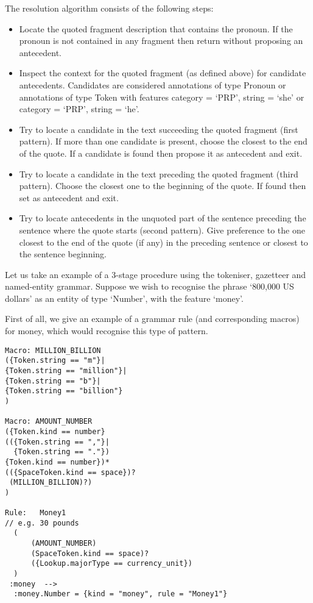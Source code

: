 The resolution algorithm consists of the following steps:
  \begin{itemize}
  \item
  Locate the quoted fragment description that contains the pronoun. If
  the pronoun is not contained in any fragment then return without
  proposing an antecedent.

  \item
  Inspect the context for the quoted fragment (as defined above) for
  candidate antecedents. Candidates are considered annotations of type
  Pronoun or annotations of type Token with features {category =
  `PRP', string = `she'} or {category = `PRP', string = `he'}.

  \item
  Try to locate a candidate in the text succeeding the quoted fragment
  (first pattern). If more than one candidate is present, choose the
  closest to the end of the quote. If a candidate is found then
  propose it as antecedent and exit.

  \item
  Try to locate a candidate in the text preceding the quoted fragment
  (third pattern). Choose the closest one to the beginning of the
  quote. If found then set as antecedent and exit.

  \item
  Try to locate antecedents in the unquoted part of the sentence
  preceding the sentence where the quote starts (second pattern). Give
  preference to the one closest to the end of the quote (if any) in
  the preceding sentence or closest to the sentence beginning.
  \end{itemize}




Let us take an example of a 3-stage procedure using the tokeniser, gazetteer
and named-entity grammar. Suppose we wish to recognise the phrase
`800,000 US dollars' as an entity of type `Number', with the
feature `money'.

First of all, we give an example of a grammar rule (and corresponding
macros) for money, which would recognise this type of pattern.

\begin{small}
\begin{verbatim}
Macro: MILLION_BILLION
({Token.string == "m"}|
{Token.string == "million"}|
{Token.string == "b"}|
{Token.string == "billion"}
)

Macro: AMOUNT_NUMBER
({Token.kind == number}
(({Token.string == ","}|
  {Token.string == "."})
{Token.kind == number})*
(({SpaceToken.kind == space})?
 (MILLION_BILLION)?)
)

Rule:	Money1
// e.g. 30 pounds
  (
      (AMOUNT_NUMBER)
      (SpaceToken.kind == space)?
      ({Lookup.majorType == currency_unit})
  )
 :money  -->
  :money.Number = {kind = "money", rule = "Money1"}
\end{verbatim}
\end{small}


